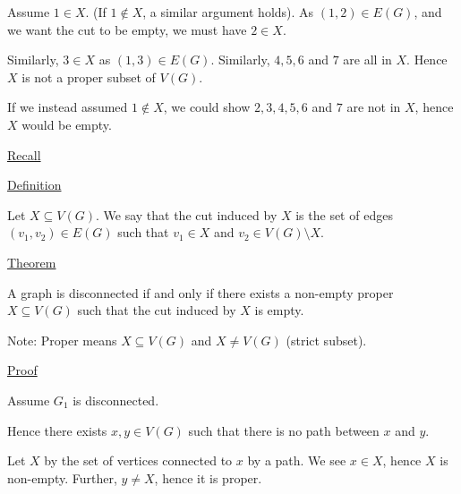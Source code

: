 \documentclass{article}
\begin{document}
\begin{center}
\end{center}

Assume $1 \in X$. (If $1 \not\in X$, a similar argument holds). As $(1,2) \in E(G)$, and we want the cut to be empty, we must have $2 \in X$. 

Similarly, $3 \in X$ as $(1,3) \in E(G)$. Similarly, $4,5,6$ and $7$ are all in $X$. Hence $X$ is not a proper subset of $V(G)$.

If we instead assumed $1 \not\in X$, we could show $2,3,4,5,6$ and $7$ are not in $X$, hence $X$ would be empty. 

\underline{Recall}

\underline{Definition}

Let $X \subseteq V(G)$. We say that the cut induced by $X$ is the set of edges $(v_1, v_2) \in E(G)$ such that $v_1 \in X$ and $v_2 \in V(G) \setminus X$. 

\underline{Theorem}

A graph is disconnected if and only if there exists a non-empty proper $X \subseteq V(G)$ such that the cut induced by $X$ is empty. 

Note: Proper means $X \subseteq V(G)$ and $X \ne V(G)$ (strict subset). 

\underline{Proof}

Assume $G_1$ is disconnected. 

Hence there exists $x,y \in V(G)$ such that there is no path between $x$ and $y$. 

Let $X$ by the set of vertices connected to $x$ by a path. We see $x \in X$, hence $X$ is non-empty. Further, $y \ne X$, hence it is proper. 
\end{document}

